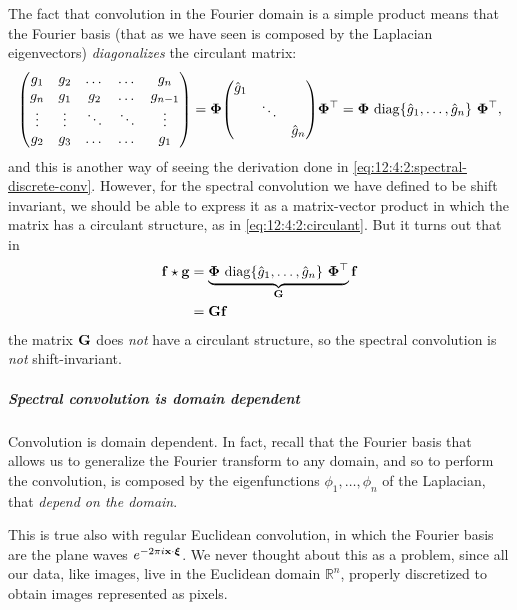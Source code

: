 The fact that convolution in the Fourier domain is a simple product means that the Fourier basis (that as we have seen is composed by the Laplacian eigenvectors) \emph{diagonalizes} the circulant matrix:
\begin{equation}
    \mqty(
            g_1 & g_2 & \dots & \dots & g_n \\
            g_n & g_1 & g_2 & \dots & g_{n-1} \\
            \vdots & \vdots & \ddots & \ddots & \vdots \\
            g_2 & g_3 & \dots & \dots & g_1
        ) = \vb*{\Phi} \mqty(
            \hat{g}_1 & & \\
            & \ddots & \\
            & & \hat{g}_n
        ) \vb*{\Phi}^{\top} = \vb*{\Phi} ~ \mathrm{diag}\{ \hat{g}_1, \dots, \hat{g}_n \} ~ \vb*{\Phi}^{\top},
\end{equation}
and this is another way of seeing the derivation done in \cref{eq:12:4:2:spectral-discrete-conv}. However, for the spectral convolution we have defined to be shift invariant, we should be able to express it as a matrix-vector product in which the matrix has a circulant structure, as in \cref{eq:12:4:2:circulant}. But it turns out that in
\begin{equation}
    \begin{aligned}
        \vb{f} \star \vb{g} & = \underbrace{\vb*{\Phi} ~ \mathrm{diag}\{ \hat{g}_1, \dots, \hat{g}_n \} ~ \vb*{\Phi}^{\top}}_{\vb{G}} \vb{f} \\
        & = \vb{G} \vb{f}
    \end{aligned}
\end{equation}
the matrix $\vb{G}$ does \emph{not} have a circulant structure, so the spectral convolution is \emph{not} shift-invariant. 


\subparagraph{Spectral convolution is domain dependent}

Convolution is domain dependent. In fact, recall that the Fourier basis that allows us to generalize the Fourier transform to any domain, and so to perform the convolution, is composed by the eigenfunctions $\phi_1, \dots, \phi_n$ of the Laplacian, that \emph{depend on the domain}. 

This is true also with regular Euclidean convolution, in which the Fourier basis are the plane waves $e^{-2\pi i \vb{x}\cdot\vb*{\xi}}$. We never thought about this as a problem, since all our data, like images, live in the Euclidean domain $\mathbb{R}^n$, properly discretized to obtain images represented as pixels. 

